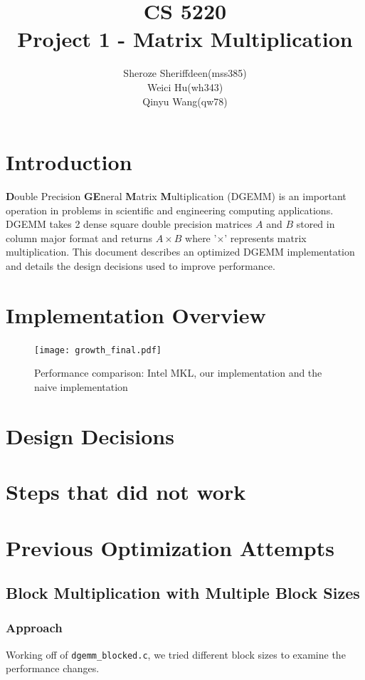 \documentclass[11pt]{article}
\theoremstyle{plain}
\theoremstyle{definition}
\begin{document}
\title{CS 5220\\ Project 1 - Matrix Multiplication}
\author{Sheroze Sheriffdeen(mss385)\\ Weici Hu(wh343)\\  Qinyu Wang(qw78)}
\maketitle

\section{Introduction}
\textbf{D}ouble Precision \textbf{GE}neral \textbf{M}atrix \textbf{M}ultiplication (DGEMM) is an important operation in problems in scientific and engineering computing applications. DGEMM takes 2 dense square double precision matrices $A$ and $B$ stored in column major format and returns $A \times B$ where '$\times$' represents matrix multiplication. This document describes an optimized DGEMM implementation and details the design decisions used to improve performance. 

\section{Implementation Overview}

\begin{figure}[H]
\centering
\texttt{[image: growth\_final.pdf]}
\caption{Performance comparison: Intel MKL, our implementation and the naive implementation}
\end{figure}


\newpage
\section{Design Decisions}

\newpage
\section{Steps that did not work}

\newpage
\section{Previous Optimization Attempts}
\subsection{Block Multiplication with Multiple Block Sizes}
\subsubsection{Approach}
Working off of \texttt{dgemm\_blocked.c}, we tried different block sizes to examine the performance changes. 
\end{document}
